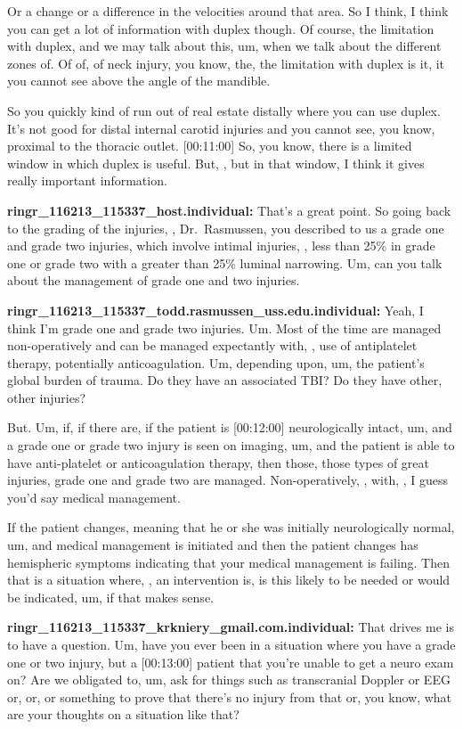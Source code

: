 \documentclass[
]{book}
\begin{document}
Or a change or a difference in the velocities around that area. So I
think, I think you can get a lot of information with duplex though. Of
course, the limitation with duplex, and we may talk about this, um, when
we talk about the different zones of. Of of, of neck injury, you know,
the, the limitation with duplex is it, it you cannot see above the angle
of the mandible.

So you quickly kind of run out of real estate distally where you can use
duplex. It's not good for distal internal carotid injuries and you
cannot see, you know, proximal to the thoracic outlet. {[}00:11:00{]} So,
you know, there is a limited window in which duplex is useful. But, ,
but in that window, I think it gives really important information.

\textbf{ringr\_116213\_115337\_host.individual:} That's a great point. So going
back to the grading of the injuries, , Dr.~Rasmussen, you described to
us a grade one and grade two injuries, which involve intimal injuries, ,
less than 25\% in grade one or grade two with a greater than 25\% luminal
narrowing. Um, can you talk about the management of grade one and two
injuries.

\textbf{ringr\_116213\_115337\_todd.rasmussen\_uss.edu.individual:} Yeah, I think
I'm grade one and grade two injuries. Um. Most of the time are managed
non-operatively and can be managed expectantly with, , use of
antiplatelet therapy, potentially anticoagulation. Um, depending upon,
um, the patient's global burden of trauma. Do they have an associated
TBI? Do they have other, other injuries?

But. Um, if, if there are, if the patient is {[}00:12:00{]} neurologically
intact, um, and a grade one or grade two injury is seen on imaging, um,
and the patient is able to have anti-platelet or anticoagulation
therapy, then those, those types of great injuries, grade one and grade
two are managed. Non-operatively, , with, , I guess you'd say medical
management.

If the patient changes, meaning that he or she was initially
neurologically normal, um, and medical management is initiated and then
the patient changes has hemispheric symptoms indicating that your
medical management is failing. Then that is a situation where, , an
intervention is, is this likely to be needed or would be indicated, um,
if that makes sense.

\textbf{ringr\_116213\_115337\_krkniery\_gmail.com.individual:} That drives me is
to have a question. Um, have you ever been in a situation where you have
a grade one or two injury, but a {[}00:13:00{]} patient that you're unable
to get a neuro exam on? Are we obligated to, um, ask for things such as
transcranial Doppler or EEG or, or, or something to prove that there's
no injury from that or, you know, what are your thoughts on a situation
like that?
\end{document}
